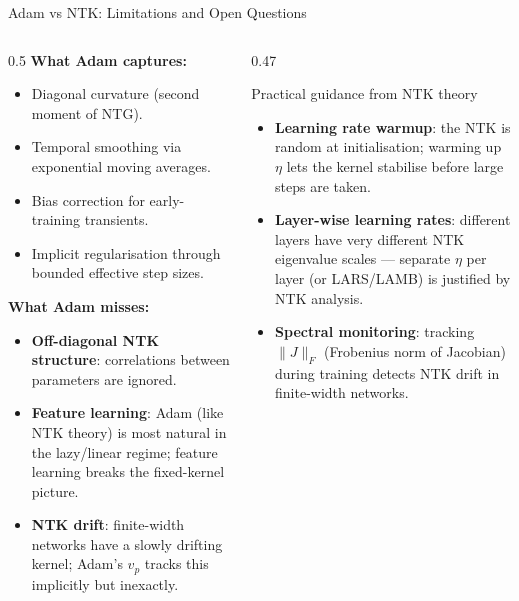 \documentclass[aspectratio=169, 10pt]{beamer}
\newcommand{\myalert}[1]{\textcolor{red!70!black}{\textbf{#1}}}
\begin{document}
\begin{frame}{Adam vs NTK: Limitations and Open Questions}
  \begin{columns}[T]
    \begin{column}{0.5\textwidth}
      \textbf{What Adam captures:}
      \begin{itemize}
        \item Diagonal curvature (second moment of NTG).
        \item Temporal smoothing via exponential moving averages.
        \item Bias correction for early-training transients.
        \item Implicit regularisation through bounded effective step sizes.
      \end{itemize}
      \vspace{0.4em}
      \textbf{What Adam misses:}
      \begin{itemize}
        \item \myalert{Off-diagonal NTK structure}: correlations between parameters are ignored.
        \item \myalert{Feature learning}: Adam (like NTK theory) is most natural in the lazy/linear regime; feature learning breaks the fixed-kernel picture.
        \item \myalert{NTK drift}: finite-width networks have a slowly drifting kernel; Adam's $v_p$ tracks this implicitly but inexactly.
      \end{itemize}
    \end{column}
    \begin{column}{0.47\textwidth}
      \begin{block}{Practical guidance from NTK theory}
        \begin{itemize}
          \item \textbf{Learning rate warmup}: the NTK is random at initialisation; warming up $\eta$ lets the kernel stabilise before large steps are taken.
          \item \textbf{Layer-wise learning rates}: different layers have very different NTK eigenvalue scales — separate $\eta$ per layer (or LARS/LAMB) is justified by NTK analysis.
          \item \textbf{Spectral monitoring}: tracking $\|J\|_F$ (Frobenius norm of Jacobian) during training detects NTK drift in finite-width networks.
        \end{itemize}
      \end{block}
    \end{column}
  \end{columns}
\end{frame}
\end{document}
